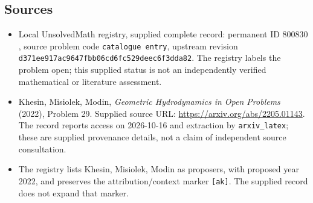 \documentclass[11pt]{article}
\begin{document}
\subsection{Sources}
\begin{itemize}
\item Local UnsolvedMath registry, supplied complete record: permanent ID \(800830\), source problem code \texttt{catalogue entry}, upstream revision \texttt{d371ee917ac9647fbb06cd6fc529deec6f3dda82}. The registry labels the problem open; this supplied status is not an independently verified mathematical or literature assessment.
\item Khesin, Misiolek, Modin, \emph{Geometric Hydrodynamics in Open Problems} (2022), Problem 29. Supplied source URL: \url{https://arxiv.org/abs/2205.01143}. The record reports access on 2026-10-16 and extraction by \texttt{arxiv\_latex}; these are supplied provenance details, not a claim of independent source consultation.
\item The registry lists Khesin, Misiolek, Modin as proposers, with proposed year 2022, and preserves the attribution/context marker \texttt{[ak]}. The supplied record does not expand that marker.
\end{itemize}
\end{document}

